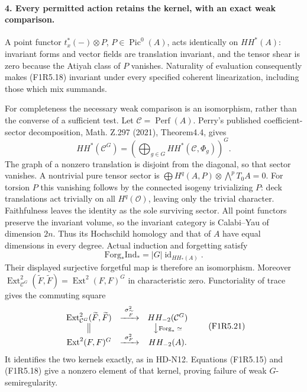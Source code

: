 \paragraph{4. Every permitted action retains the kernel, with an exact weak comparison.}
A point functor $t_x^*(-)\otimes P$, $P\in\operatorname{Pic}^0(A)$,
acts identically on $HH^*(A)$: invariant forms and vector
fields are translation invariant, and the tensor shear is
zero because the Atiyah class of $P$ vanishes. Naturality
of evaluation consequently makes (F1R5.18) invariant under
every specified coherent linearization, including those which
mix summands.

For completeness the necessary weak comparison is an
isomorphism, rather than the converse of a sufficient test.
Let $\mathcal C=\operatorname{Perf}(A)$. Perry's published
coefficient-sector decomposition, Math. Z.297 (2021),
Theorem4.4, gives
\[
 HH^*(\mathcal C^G)
   =\left(\bigoplus_{g\in G}HH^*(\mathcal C,\Phi_g)\right)^G.
 \tag{F1R5.19}
\]
The graph of a nonzero translation is disjoint from the
diagonal, so that sector vanishes. A nontrivial pure tensor
sector is $\bigoplus H^q(A,P)\otimes\bigwedge^pT_0A=0$.
For torsion $P$ this vanishing follows by the connected
isogeny trivializing $P$: deck translations act trivially
on all $H^q(\mathcal O)$, leaving only the trivial character.
Faithfulness leaves the identity as the sole surviving sector.
All point functors preserve the invariant volume, so
the invariant category is Calabi--Yau of dimension $2n$.
Thus its Hochschild homology and that of $A$ have equal
dimensions in every degree. Actual induction and forgetting
satisfy
\[
 \mathrm{Forg}_*\mathrm{Ind}_*=|G|\operatorname{id}_{HH_*(A)}.
 \tag{F1R5.20}
\]
Their displayed surjective forgetful map is therefore an
isomorphism. Moreover
$\operatorname{Ext}^2_{\mathcal C^G}(\widetilde F,\widetilde F)
 =\operatorname{Ext}^2(F,F)^G$ in characteristic zero.
Functoriality of trace gives the commuting square
\[
\begin{array}{ccc}
 \operatorname{Ext}^2_{\mathcal C^G}(\widetilde F,\widetilde F)
 &\xrightarrow{\ \sigma_{\widetilde F}^2\ }&HH_{-2}(\mathcal C^G)\\
 \big\Vert&&\big\downarrow\scriptstyle{\mathrm{Forg}_*\;\simeq}\\
 \operatorname{Ext}^2(F,F)^G
 &\xrightarrow{\ \sigma_F^2\ }&HH_{-2}(A).
\end{array}
 \tag{F1R5.21}
\]
It identifies the two kernels exactly, as in HD-N12.
Equations (F1R5.15) and (F1R5.18) give a nonzero element
of that kernel, proving failure of weak $G$-semiregularity.

